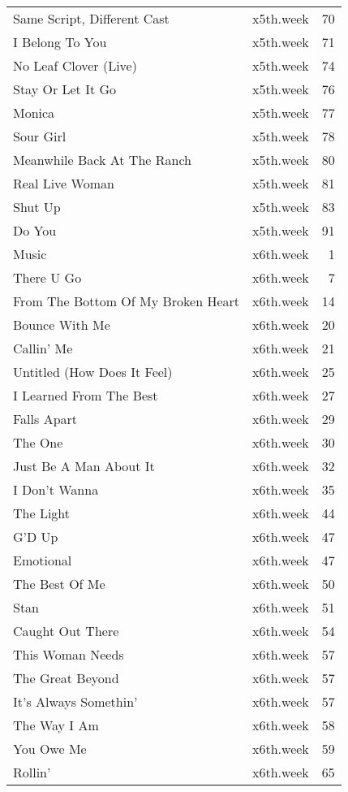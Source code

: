 \begin{table}[ht]
\begin{tabular}{llr}
  Same Script, Different Cast & x5th.week &  70 \\ 
  I Belong To You & x5th.week &  71 \\ 
  No Leaf Clover (Live) & x5th.week &  74 \\ 
  Stay Or Let It Go & x5th.week &  76 \\ 
  Monica & x5th.week &  77 \\ 
  Sour Girl & x5th.week &  78 \\ 
  Meanwhile Back At The Ranch & x5th.week &  80 \\ 
  Real Live Woman & x5th.week &  81 \\ 
  Shut Up & x5th.week &  83 \\ 
  Do You & x5th.week &  91 \\ 
  Music & x6th.week &   1 \\ 
  There U Go & x6th.week &   7 \\ 
  From The Bottom Of My Broken Heart & x6th.week &  14 \\ 
  Bounce With Me & x6th.week &  20 \\ 
  Callin' Me & x6th.week &  21 \\ 
  Untitled (How Does It Feel) & x6th.week &  25 \\ 
  I Learned From The Best & x6th.week &  27 \\ 
  Falls Apart & x6th.week &  29 \\ 
  The One & x6th.week &  30 \\ 
  Just Be A Man About It & x6th.week &  32 \\ 
  I Don't Wanna & x6th.week &  35 \\ 
  The Light & x6th.week &  44 \\ 
  G'D Up & x6th.week &  47 \\ 
  Emotional & x6th.week &  47 \\ 
  The Best Of Me & x6th.week &  50 \\ 
  Stan & x6th.week &  51 \\ 
  Caught Out There & x6th.week &  54 \\ 
  This Woman Needs & x6th.week &  57 \\ 
  The Great Beyond & x6th.week &  57 \\ 
  It's Always Somethin' & x6th.week &  57 \\ 
  The Way I Am & x6th.week &  58 \\ 
  You Owe Me & x6th.week &  59 \\ 
  Rollin' & x6th.week &  65 \\ 

\end{tabular}
\end{table}
